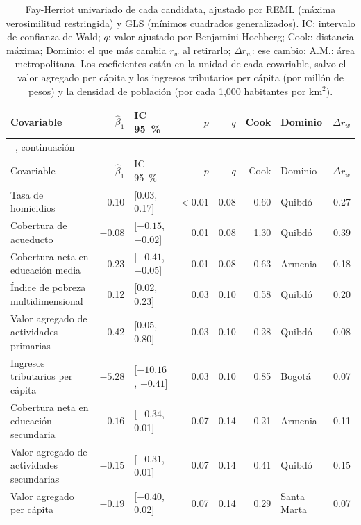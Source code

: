 {\footnotesize\setlength{\tabcolsep}{3pt}
\begin{longtable}{p{2.4cm} r p{2.3cm} r r r p{1.9cm} r}
\caption[Fay-Herriot univariado de cada candidata]{Fay-Herriot univariado de cada candidata, ajustado por REML (máxima verosimilitud restringida) y GLS (mínimos cuadrados generalizados). IC: intervalo de confianza de Wald; $q$: valor ajustado por Benjamini-Hochberg; Cook: distancia máxima; Dominio: el que más cambia $r_w$ al retirarlo; $\Delta r_w$: ese cambio; A.M.: área metropolitana. Los coeficientes están en la unidad de cada covariable, salvo el valor agregado per cápita y los ingresos tributarios per cápita (por millón de pesos) y la densidad de población (por cada 1,000 habitantes por km$^2$).}
\label{tab:app_seleccion} \\
\toprule
Covariable & $\hat{\beta}_1$ & IC 95~\% & $p$ & $q$ & Cook & Dominio & $\Delta r_w$ \\
\midrule
\endfirsthead
\multicolumn{8}{l}{\tablename~\thetable{}, continuación} \\
\toprule
Covariable & $\hat{\beta}_1$ & IC 95~\% & $p$ & $q$ & Cook & Dominio & $\Delta r_w$ \\
\midrule
\endhead
\bottomrule
\endlastfoot
Tasa de homicidios & 0.10 & [0.03, 0.17] & $<0.01$ & 0.08 & 0.60 & Quibdó & 0.27 \\
Cobertura de acueducto & $-0.08$ & [$-0.15$, $-0.02$] & 0.01 & 0.08 & 1.30 & Quibdó & 0.39 \\
Cobertura neta en educación media & $-0.23$ & [$-0.41$, $-0.05$] & 0.01 & 0.08 & 0.63 & Armenia & 0.18 \\
Índice de pobreza multidimensional & 0.12 & [0.02, 0.23] & 0.03 & 0.10 & 0.58 & Quibdó & 0.20 \\
Valor agregado de actividades primarias & 0.42 & [0.05, 0.80] & 0.03 & 0.10 & 0.28 & Quibdó & 0.08 \\
Ingresos tributarios per cápita & $-5.28$ & [$-10.16$, $-0.41$] & 0.03 & 0.10 & 0.85 & Bogotá & 0.07 \\
Cobertura neta en educación secundaria & $-0.16$ & [$-0.34$, 0.01] & 0.07 & 0.14 & 0.21 & Armenia & 0.11 \\
Valor agregado de actividades secundarias & $-0.15$ & [$-0.31$, 0.01] & 0.07 & 0.14 & 0.41 & Quibdó & 0.15 \\
Valor agregado per cápita & $-0.19$ & [$-0.40$, 0.02] & 0.07 & 0.14 & 0.29 & Santa Marta & 0.07 \\

\end{longtable}}
